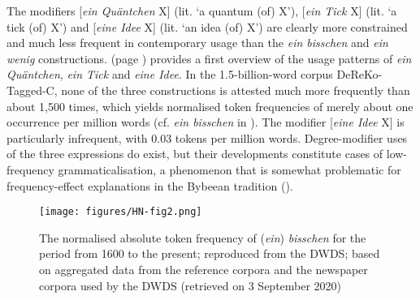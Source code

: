\documentclass[output=paper]{langsci/langscibook}
\begin{document}
The modifiers [\textit{ein Quäntchen} X] (lit. ‘a quantum (of) X’), [\textit{ein Tick} X] (lit. ‘a tick (of) X’) and [\textit{eine Idee} X] (lit. ‘an idea (of) X’) are clearly more constrained and much less frequent in contemporary usage than the \textit{ein bisschen} and \textit{ein wenig} constructions.  (page \pageref{tab:1:frequencies}) provides a first overview of the usage patterns of \textit{ein Quäntchen}, \textit{ein Tick} and \textit{eine Idee}. In the 1.5-billion-word corpus DeReKo-Tagged-C, none of the three constructions is attested much more frequently than about 1,500 times, which yields normalised token frequencies of merely about one occurrence per million words (cf. \textit{ein bisschen} in ). The modifier [\textit{eine Idee} X] is particularly infrequent, with 0.03 tokens per million words. Degree\hyp{}modifier uses of the three expressions do exist, but their developments constitute cases of low-frequency grammaticalisation, a phenomenon that is somewhat problematic for frequency-effect explanations in the Bybeean tradition (\citealt{HoffmannArelowfrequencycomplex2004, BremsGrammaticalizationSmallSize2007, NeelsRefiningfrequencyeffectexplanations2020}).

\begin{figure}[p]
  \texttt{[image: figures/HN-fig2.png]}
  \caption{The normalised absolute token frequency of (\textit{ein}) \textit{bisschen} for the period from 1600 to the present; reproduced from the DWDS; based on aggregated data from the reference corpora and the newspaper corpora used by the DWDS (retrieved on 3 September 2020)}\label{fig:dwdsfreqs}
\end{figure}
\end{document}
